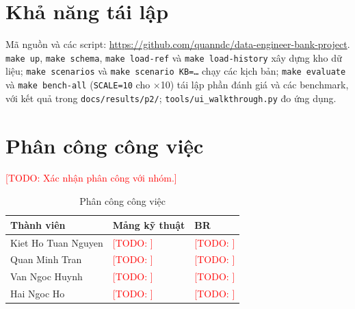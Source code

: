\documentclass[peerreview]{IEEEtran}
\newcommand{\todo}[1]{\textcolor{red}{[TODO: #1]}}
\begin{document}
\section{Khả năng tái lập}
\label{App:Reproducibility}
Mã nguồn và các script: \url{https://github.com/quanndc/data-engineer-bank-project}.
\texttt{make up}, \texttt{make schema}, \texttt{make load-ref} và \texttt{make load-history}
xây dựng kho dữ liệu; \texttt{make scenarios} và \texttt{make scenario KB=\ldots} chạy các
kịch bản; \texttt{make evaluate} và \texttt{make bench-all} (\texttt{SCALE=10} cho
$\times$10) tái lập phần đánh giá và các benchmark, với kết quả trong
\texttt{docs/results/p2/}; \texttt{tools/ui\_walkthrough.py} đo ứng dụng.

\section{Phân công công việc}
\label{App:Work}

\todo{Xác nhận phân công với nhóm.}

\begin{table}[!h]
\centering
\caption{Phân công công việc}
\label{tab:work}
\footnotesize
\setlength{\tabcolsep}{4pt}
\begin{tabular}{L{2.6cm} L{3.4cm} L{1.6cm}}
\toprule
\textbf{Thành viên} & \textbf{Mảng kỹ thuật} & \textbf{BR} \\
\midrule
Kiet Ho Tuan Nguyen & \todo{} & \todo{} \\
Quan Minh Tran & \todo{} & \todo{} \\
Van Ngoc Huynh & \todo{} & \todo{} \\
Hai Ngoc Ho & \todo{} & \todo{} \\
\bottomrule
\end{tabular}
\end{table}
\end{document}
